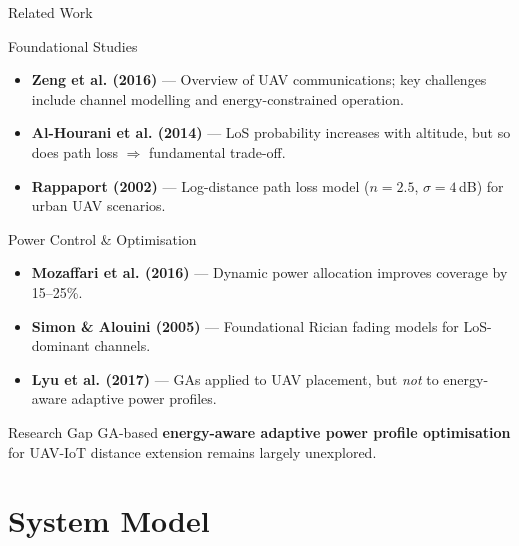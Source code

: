\documentclass[aspectratio=169, 11pt]{beamer}
\begin{document}
\begin{frame}{Related Work}
\begin{block}{Foundational Studies}
\begin{itemize}
  \item \textbf{Zeng et al. (2016)} --- Overview of UAV communications; key challenges include channel modelling and energy-constrained operation.
  \item \textbf{Al-Hourani et al. (2014)} --- LoS probability increases with altitude, but so does path loss $\Rightarrow$ fundamental trade-off.
  \item \textbf{Rappaport (2002)} --- Log-distance path loss model ($n=2.5$, $\sigma=4$\,dB) for urban UAV scenarios.
\end{itemize}
\end{block}
\begin{block}{Power Control \& Optimisation}
\begin{itemize}
  \item \textbf{Mozaffari et al. (2016)} --- Dynamic power allocation improves coverage by 15--25\%.
  \item \textbf{Simon \& Alouini (2005)} --- Foundational Rician fading models for LoS-dominant channels.
  \item \textbf{Lyu et al. (2017)} --- GAs applied to UAV placement, but \textit{not} to energy-aware adaptive power profiles.
\end{itemize}
\end{block}
\begin{alertblock}{Research Gap}
GA-based \textbf{energy-aware adaptive power profile optimisation} for UAV-IoT distance extension remains largely unexplored.
\end{alertblock}
\end{frame}

\section{System Model}
\end{document}
